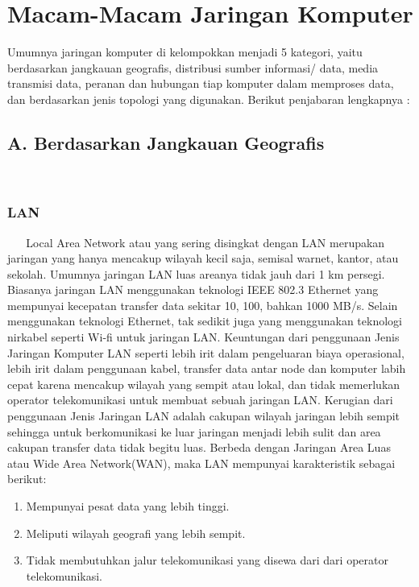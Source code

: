 \section{Macam-Macam Jaringan Komputer}
  Umumnya jaringan komputer di kelompokkan menjadi 5 kategori, yaitu berdasarkan jangkauan geografis, distribusi sumber informasi/ data, media transmisi data, peranan dan hubungan tiap komputer dalam memproses data, dan berdasarkan jenis topologi yang digunakan. Berikut penjabaran lengkapnya :
  \subsection{A. Berdasarkan Jangkauan Geografis}
    \subsubsection{LAN} 
      Local Area Network atau yang sering disingkat dengan LAN merupakan jaringan yang hanya mencakup wilayah kecil saja, semisal warnet, kantor, atau sekolah. Umumnya jaringan LAN luas areanya tidak jauh dari 1 km persegi.
    Biasanya jaringan LAN menggunakan teknologi IEEE 802.3 Ethernet yang mempunyai kecepatan transfer data sekitar 10, 100, bahkan 1000 MB/s. Selain menggunakan teknologi Ethernet, tak sedikit juga yang menggunakan teknologi nirkabel seperti Wi-fi untuk jaringan LAN.
    Keuntungan dari penggunaan Jenis Jaringan Komputer LAN seperti lebih irit dalam pengeluaran biaya operasional, lebih irit dalam penggunaan kabel, transfer data antar node dan komputer labih cepat karena mencakup wilayah yang sempit atau lokal, dan tidak memerlukan operator telekomunikasi untuk membuat sebuah jaringan LAN.
    Kerugian dari penggunaan Jenis Jaringan LAN adalah cakupan wilayah jaringan lebih sempit sehingga untuk berkomunikasi ke luar jaringan menjadi lebih sulit dan area cakupan transfer data tidak begitu luas.
    Berbeda dengan Jaringan Area Luas atau Wide Area Network(WAN), maka LAN mempunyai karakteristik sebagai berikut:
    \begin{enumerate}
    \item Mempunyai pesat data yang lebih tinggi.
    \item Meliputi wilayah geografi yang lebih sempit.
    \item Tidak membutuhkan jalur telekomunikasi yang disewa dari dari operator telekomunikasi.
    \end{enumerate}
